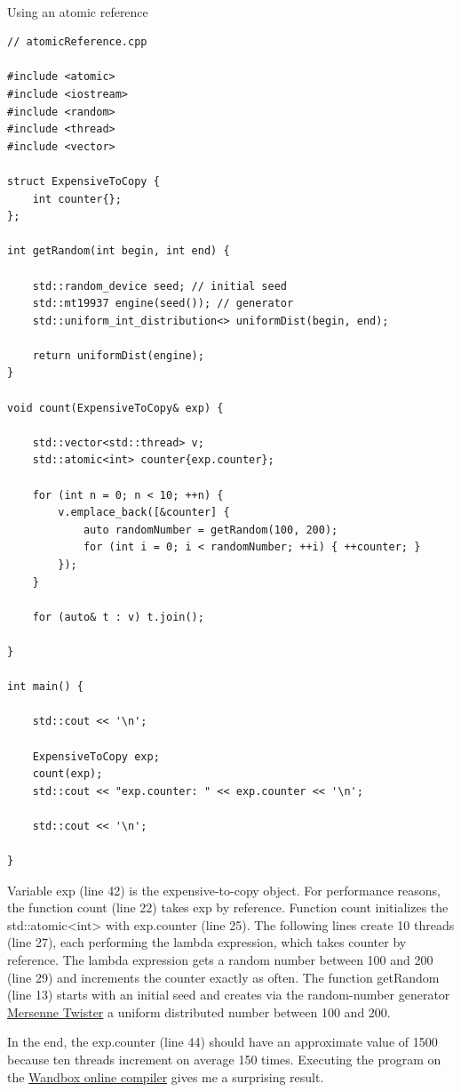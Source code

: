 \hspace*{\fill} \\ %
\noindent
Using an atomic reference
\begin{lstlisting}[style=styleCXX]
// atomicReference.cpp

#include <atomic>
#include <iostream>
#include <random>
#include <thread>
#include <vector>

struct ExpensiveToCopy {
	int counter{};
};

int getRandom(int begin, int end) {
	
	std::random_device seed; // initial seed
	std::mt19937 engine(seed()); // generator
	std::uniform_int_distribution<> uniformDist(begin, end);
	
	return uniformDist(engine);
}

void count(ExpensiveToCopy& exp) {

	std::vector<std::thread> v;
	std::atomic<int> counter{exp.counter};
	
	for (int n = 0; n < 10; ++n) {
		v.emplace_back([&counter] {
			auto randomNumber = getRandom(100, 200);
			for (int i = 0; i < randomNumber; ++i) { ++counter; }
		});
	}
	
	for (auto& t : v) t.join();

}

int main() {
	
	std::cout << '\n';
	
	ExpensiveToCopy exp;
	count(exp);
	std::cout << "exp.counter: " << exp.counter << '\n';
	
	std::cout << '\n';

}
\end{lstlisting}

Variable exp (line 42) is the expensive-to-copy object. For performance reasons, the function count (line 22) takes exp by reference. Function count initializes the std::atomic<int> with exp.counter (line 25). The following lines create 10 threads (line 27), each performing the lambda expression, which takes counter by reference. The lambda expression gets a random number between 100 and 200 (line 29) and increments the counter exactly as often. The function getRandom (line 13) starts with an initial seed and creates via the random-number generator \href{https://en.wikipedia.org/wiki/Mersenne_Twister}{Mersenne Twister} a uniform distributed number between 100 and 200.

In the end, the exp.counter (line 44) should have an approximate value of 1500 because ten threads increment on average 150 times. Executing the program on the \href{https://wandbox.org/}{Wandbox online compiler} gives me a surprising result.

